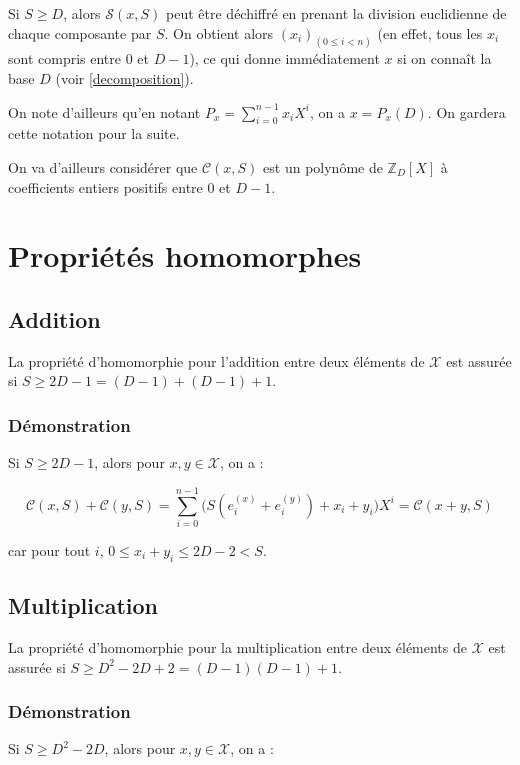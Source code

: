 \documentclass{article}
\begin{document}
Si $S\ge D$, alors $\mathcal{S}(x, S)$ peut être déchiffré en prenant la division euclidienne de chaque composante par $S$. On obtient alors $(x_i)_{(0\le i<n)}$ (en effet, tous les $x_i$ sont compris entre 0 et $D-1$), ce qui donne immédiatement $x$ si on connaît la base $D$ (voir \ref{decomposition}).

On note d'ailleurs qu'en notant $P_x=\displaystyle\sum_{i=0}^{n-1}x_i X^i$, on a $x=P_x(D)$. On gardera cette notation pour la suite.

On va d'ailleurs considérer que $\mathcal{C}(x, S)$ est un polynôme de $\mathbb{Z}_D[X]$ à coefficients entiers positifs entre 0 et $D-1$.

\section{Propriétés homomorphes}

\subsection{Addition}
\label{addition}
La propriété d'homomorphie pour l'addition entre deux éléments de $\mathcal{X}$ est assurée si $S\ge 2D-1=(D-1)+(D-1)+1$.

\subsubsection{Démonstration}
Si $S\ge 2D-1$, alors pour $x, y \in \mathcal{X}$, on a :

\begin{equation}
\mathcal{C}(x, S) + \mathcal{C}(y, S) = \displaystyle \sum_{i=0}^{n-1} \Big( S(e_i^{(x)} + e_i^{(y)}) + x_i + y_i \Big) X^i= \mathcal{C}(x+y, S)
\end{equation}

car pour tout $i$, $0\le x_i + y_i \le 2D-2<S$.


\subsection{Multiplication}
\label{multiplication}
La propriété d'homomorphie pour la multiplication entre deux éléments de $\mathcal{X}$ est assurée si $S\ge D^2-2D+2=(D-1)(D-1)+1$. 

\subsubsection{Démonstration}
Si $S\ge D^2-2D$, alors pour $x, y \in \mathcal{X}$, on a :
\end{document}
